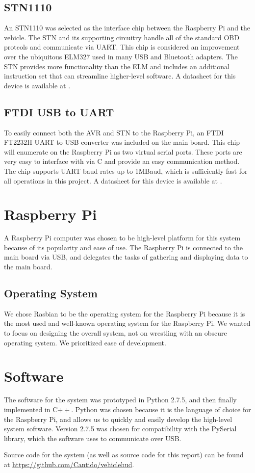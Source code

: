 \subsection{STN1110}
An STN1110 was selected as the interface chip between the Raspberry Pi and the 
vehicle.  The STN and its supporting circuitry handle all of the standard OBD
protcols and communicate via UART.  This chip is considered an improvement over
the ubiquitous ELM327 used in many USB and Bluetooth adapters.  The STN provides
more functionality than the ELM and includes an additional instruction set that
can streamline higher-level software. A datasheet for this device is available
at \cite{stn1110ds}.

\subsection{FTDI USB to UART}
To easily connect both the AVR and STN to the Raspberry Pi, an FTDI FT2232H UART 
to USB converter was included on the main board.  This chip will enumerate on the
Raspberry Pi as two virtual serial ports.  These ports are very easy to interface
with via C and provide an easy communication method.  The chip supports UART baud
rates up to 1MBaud, which is sufficiently fast for all operations in this project.
A datasheet for this device is available at \cite{ft2232hds}.

\section{Raspberry Pi}
\label{sec:raspi-design}

A Raspberry Pi computer was chosen to be high-level platform for this system
because of its popularity and ease of use. The Raspberry Pi is connected to the
main board via USB, and delegates the tasks of gathering and displaying data
to the main board.

\subsection{Operating System}
We chose Rasbian to be the operating system for the Raspberry Pi because it is the
most used and well-known operating system for the Raspberry Pi. We wanted to focus
on designing the overall
system, not on wrestling with an obscure operating system. We prioritized ease
of development.

\section{Software}
The software for the system was prototyped in Python 2.7.5, and then finally
implemented in C$++$. Python was chosen
because it is the language of choice for the Raspberry Pi, and allows us to
quickly and easily develop the high-level system software. Version 2.7.5 was
chosen for compatibility with the PySerial library, which the software uses to
communicate over USB.

Source code for the system (as well as source code for this report) can be
found at \url{https://github.com/Cantido/vehiclehud}.
